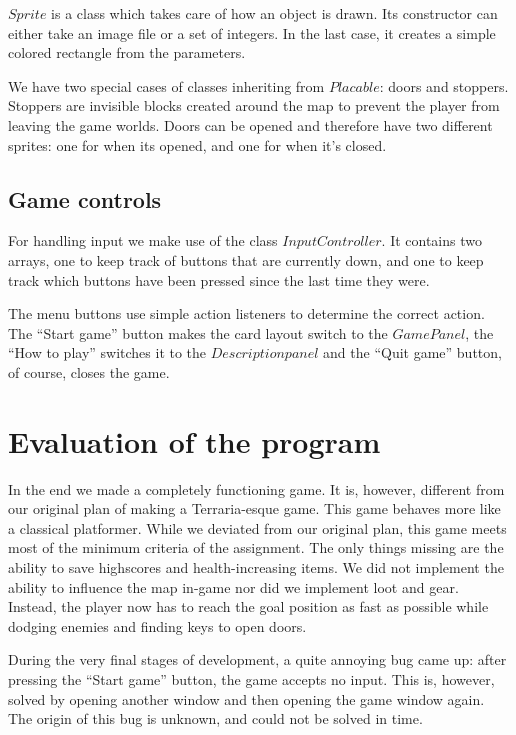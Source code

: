 \documentclass[a4paper,10pt,twoside]{article}
\begin{document}
$Sprite$ is a class which takes care of how an object is drawn. Its constructor can either take an image file or a set of integers. In the last case, it creates a simple colored rectangle from the parameters.

We have two special cases of classes inheriting from $Placable$: doors and stoppers. Stoppers are invisible blocks created around the map to prevent the player from leaving the game worlds. Doors can be opened and therefore have two different sprites: one for when its opened, and one for when it's closed.

\subsection{Game controls}
For handling input we make use of the class $InputController$. It contains two arrays, one to keep track of buttons that are currently down, and one to keep track which buttons have been pressed since the last time they were.

The menu buttons use simple action listeners to determine the correct action. The ``Start game'' button makes the card layout switch to the $GamePanel$, the ``How to play'' switches it to the $Description panel$ and the ``Quit game'' button, of course, closes the game. 

\section{Evaluation of the program}
In the end we made a completely functioning game. It is, however, different from our original plan of making a Terraria-esque game. This game behaves more like a classical platformer. While we deviated from our original plan, this game meets most of the minimum criteria of the assignment. The only things missing are the ability to save highscores and health-increasing items. We did not implement the ability to influence the map in-game nor did we implement loot and gear. Instead, the player now has to reach the goal position as fast as possible while dodging enemies and finding keys to open doors.

During the very final stages of development, a quite annoying bug came up: after pressing the ``Start game'' button, the game accepts no input. This is, however, solved by opening another window and then opening the game window again. The origin of this bug is unknown, and could not be solved in time.
\end{document}
